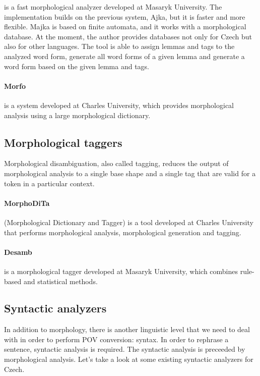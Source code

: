 is a fast morphological analyzer developed at Masaryk University. The implementation builds on the previous system, Ajka, but it is faster and more flexible. Majka is based on finite automata, and it works with a morphological database. At the moment, the author provides databases not only for Czech but also for other languages. The tool is able to assign lemmas and tags to the analyzed word form, generate all word forms of a given lemma and generate a word form based on the given lemma and tags. \cite{majka}

\paragraph{Morfo} is a system developed at Charles University, which provides morphological analysis using a large morphological dictionary. \cite{morfo}


\subsection{Morphological taggers}

Morphological disambiguation, also called tagging, reduces the output of morphological analysis to a single base shape and a single tag that are valid for a token in a particular context.

\paragraph{MorphoDiTa} (Morphological Dictionary and Tagger) is a tool developed at Charles University that performs morphological analysis, morphological generation and tagging. \cite{strakova14}

\paragraph{Desamb} is a morphological tagger developed at Masaryk University, which combines rule-based and statistical methods. \cite{desamb2010}


\subsection{Syntactic analyzers}
\label{sec:synt-an}

In addition to morphology, there is another linguistic level that we need to deal with in order to perform POV conversion: syntax. In order to rephrase a sentence, syntactic analysis is required. The syntactic analysis is preceeded by morphological analysis. Let's take a look at some existing syntactic analyzers for Czech.

